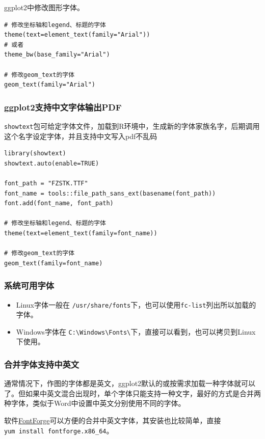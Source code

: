 \documentclass[]{article}
\numberwithin{figure}{section}
\numberwithin{table}{section}
\theoremstyle{definition}
\theoremstyle{definition}
\theoremstyle{definition}
\theoremstyle{remark}
\begin{document}
ggplot2中修改图形字体。

\begin{verbatim}
# 修改坐标轴和legend、标题的字体
theme(text=element_text(family="Arial"))
# 或者
theme_bw(base_family="Arial")

# 修改geom_text的字体
geom_text(family="Arial")
\end{verbatim}

\subsubsection{ggplot2支持中文字体输出PDF}\label{ggplot2pdf}

\texttt{showtext}包可给定字体文件，加载到R环境中，生成新的字体家族名字，后期调用这个名字设定字体，并且支持中文写入pdf不乱码

\begin{verbatim}
library(showtext)
showtext.auto(enable=TRUE)

font_path = "FZSTK.TTF"
font_name = tools::file_path_sans_ext(basename(font_path))
font.add(font_name, font_path)

# 修改坐标轴和legend、标题的字体
theme(text=element_text(family=font_name))

# 修改geom_text的字体
geom_text(family=font_name)
\end{verbatim}

\subsubsection{系统可用字体}

\begin{itemize}
\item
  Linux字体一般在
  \texttt{/usr/share/fonts}下，也可以使用\texttt{fc-list}列出所以加载的字体。
\item
  Windows字体在
  \texttt{C:\textbackslash{}Windows\textbackslash{}Fonts\textbackslash{}}下，直接可以看到，也可以拷贝到Linux下使用。
\end{itemize}

\subsubsection{合并字体支持中英文}

通常情况下，作图的字体都是英文，ggplot2默认的或按需求加载一种字体就可以了。但如果中英文混合出现时，单个字体只能支持一种文字，最好的方式是合并两种字体，类似于Word中设置中英文分别使用不同的字体。

软件\href{https://github.com/fontforge/fontforge}{FontForge}可以方便的合并中英文字体，其安装也比较简单，直接
\texttt{yum\ install\ fontforge.x86\_64}。
\end{document}
